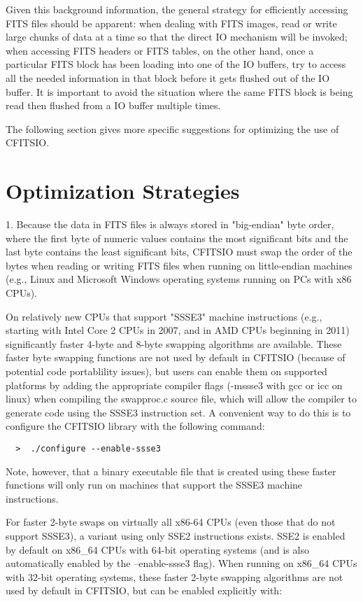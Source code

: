 \documentclass[11pt]{book}
\begin{document}
Given this background information, the general strategy for efficiently
accessing FITS files should be apparent:  when dealing with FITS
images, read or write large chunks of data at a time so that the direct
IO mechanism will be invoked;  when accessing FITS headers or FITS
tables, on the other hand, once a particular FITS block has been
loading into one of the IO buffers, try to access all the needed
information in that block before it gets flushed out of the IO buffer.
It is important to avoid the situation where the same FITS block is
being read then flushed from a IO buffer multiple times.

The following section gives more specific suggestions for optimizing
the use of CFITSIO.


\section{Optimization Strategies}

1.  Because the data in FITS files is always stored in "big-endian" byte order,
where the first byte of numeric values contains the most significant bits and the
last byte contains the least significant bits, CFITSIO must swap the order of the bytes
when reading or writing FITS files when running on little-endian machines (e.g.,
Linux and Microsoft Windows operating systems running on PCs with x86 CPUs).

On relatively new CPUs that support "SSSE3" machine instructions
(e.g., starting with Intel Core 2 CPUs in 2007, and in AMD CPUs
beginning in 2011) significantly faster 4-byte and 8-byte swapping
algorithms are available. These faster byte swapping functions are
not used by default in CFITSIO (because of potential code
portablility issues), but users can enable them on supported
platforms by adding the appropriate compiler flags (-mssse3 with gcc
or icc on linux) when compiling the swapproc.c source file, which will
allow the compiler to generate code using the SSSE3 instruction set.
A convenient way to do this is to configure the CFITSIO library
with the following command:

\begin{verbatim}
  >  ./configure --enable-ssse3
\end{verbatim}
Note, however, that a binary executable file that is
created using these faster functions will only run on
machines that support the SSSE3 machine instructions.

For faster 2-byte swaps on virtually all x86-64 CPUs (even those that
do not support SSSE3), a variant using only SSE2 instructions exists.
SSE2 is enabled by default on x86\_64 CPUs with 64-bit operating systems
(and is also automatically enabled by the --enable-ssse3 flag).
When running on x86\_64 CPUs with 32-bit operating systems, these faster
2-byte swapping algorithms are not used by default in CFITSIO, but can be
enabled explicitly with:
\end{document}
